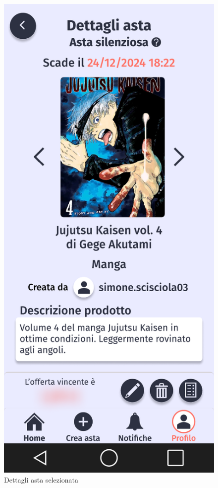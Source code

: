         \begin{figure}[!htb]
            \begin{minipage}{0.32\textwidth}
                \centering
                \includegraphics[width=.7\linewidth]{Immagini/Frames/Venditore/V17.pdf}
                \caption{Dettagli asta selezionata}
            \end{minipage}\hfill
            \begin{minipage}{0.32\textwidth}
                \centering

\end{minipage}
\end{figure}

